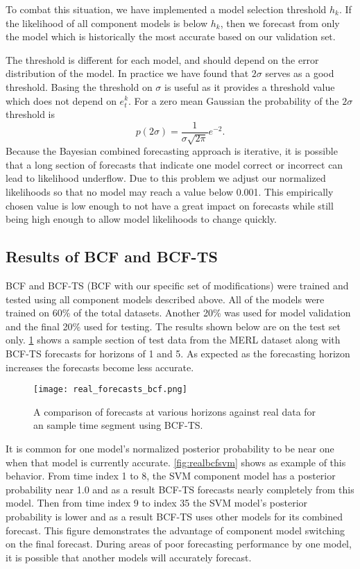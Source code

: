 To combat this situation, we have implemented a model selection threshold $h_{k}$.  If the likelihood of all component models is below $h_{k}$, then we forecast from only the model which is historically the most accurate based on our validation set.  

The threshold is different for each model, and should depend on the error distribution of the model.  In practice we have found that $2\sigma$ serves as a good threshold.  Basing the threshold on $\sigma$ is useful as it provides a threshold value which does not depend on $e^{k}_{t}$.  For a zero mean Gaussian the probability of the $2\sigma$ threshold is
\begin{equation}
p(2\sigma) = \frac{1}{\sigma\sqrt{2\pi}}e^{-2}.
\end{equation}
Because the Bayesian combined forecasting approach is iterative, it is possible that a long section of forecasts that indicate one model correct or incorrect can lead to likelihood underflow.  Due to this problem we adjust our normalized likelihoods so that no model may reach a value below 0.001.  This empirically chosen value is low enough to not have a great impact on forecasts while still being high enough to allow model likelihoods to change quickly.

\subsection{Results of BCF and BCF-TS}

BCF and BCF-TS (BCF with our specific set of modifications) were trained and tested using all component models described above.  All of the models were trained on 60\% of the total datasets.  Another 20\% was used for model validation and the final 20\% used for testing.  The results shown below are on the test set only.  \ref{fig:realbcf} shows a sample section of test data from the MERL dataset along with BCF-TS forecasts for horizons of 1 and 5.  As expected as the forecasting horizon increases the forecasts become less accurate.

\begin{figure}[h]
\centering
\texttt{[image: real\_forecasts\_bcf.png]}
\caption{A comparison of forecasts at various horizons against real data for an sample time segment using BCF-TS.}
\label{fig:realbcf}
\end{figure}

It is common for one model's normalized posterior probability to be near one when that model is currently accurate.  \ref{fig:realbcfsvm} shows as example of this behavior.  From time index 1 to 8, the SVM component model has a posterior probability near 1.0 and as a result BCF-TS forecasts nearly completely from this model.  Then from time index 9 to index 35 the SVM model's posterior probability is lower and as a result BCF-TS uses other models for its combined forecast.  This figure demonstrates the advantage of component model switching on the final forecast.  During areas of poor forecasting performance by one model, it is possible that another models will accurately forecast.


